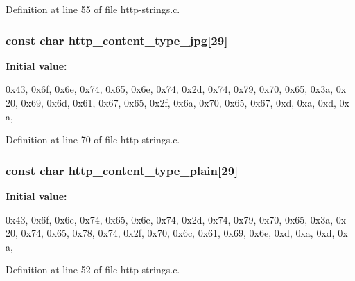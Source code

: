 Definition at line 55 of file http-\/strings.c.

\hypertarget{http-strings_8c_a34bd96a209a37f4b16744500510c50a0}{
\subsubsection[{http\_\-content\_\-type\_\-jpg}]{\setlength{\rightskip}{0pt plus 5cm}const char {\bf http\_\-content\_\-type\_\-jpg}\mbox{[}29\mbox{]}}}
\label{http-strings_8c_a34bd96a209a37f4b16744500510c50a0}
{\bfseries Initial value:}
\begin{DoxyCode}
 

{0x43, 0x6f, 0x6e, 0x74, 0x65, 0x6e, 0x74, 0x2d, 0x74, 0x79, 0x70, 0x65, 0x3a, 0x
      20, 0x69, 0x6d, 0x61, 0x67, 0x65, 0x2f, 0x6a, 0x70, 0x65, 0x67, 0xd, 0xa, 0xd, 0x
      a, }
\end{DoxyCode}


Definition at line 70 of file http-\/strings.c.

\hypertarget{http-strings_8c_a93ca46951cc4842f1abde782f3d2358d}{
\subsubsection[{http\_\-content\_\-type\_\-plain}]{\setlength{\rightskip}{0pt plus 5cm}const char {\bf http\_\-content\_\-type\_\-plain}\mbox{[}29\mbox{]}}}
\label{http-strings_8c_a93ca46951cc4842f1abde782f3d2358d}
{\bfseries Initial value:}
\begin{DoxyCode}
 

{0x43, 0x6f, 0x6e, 0x74, 0x65, 0x6e, 0x74, 0x2d, 0x74, 0x79, 0x70, 0x65, 0x3a, 0x
      20, 0x74, 0x65, 0x78, 0x74, 0x2f, 0x70, 0x6c, 0x61, 0x69, 0x6e, 0xd, 0xa, 0xd, 0x
      a, }
\end{DoxyCode}


Definition at line 52 of file http-\/strings.c.

